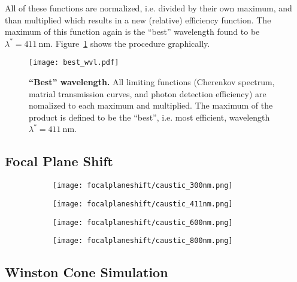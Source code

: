 All of these functions are normalized, i.e. divided by their own maximum, and than multiplied which results in a new (relative) efficiency function. The maximum of this function again is the \enquote{best} wavelength found to be $\lambda^\ast = \SI{411}{\nano\meter}$. Figure~\ref{best_wvl} shows the procedure graphically. 

\begin{figure}[H]
	\centering
	\texttt{[image: best\_wvl.pdf]}
	\caption[\enquote{Best} wavelength]{\textbf{\enquote{Best} wavelength.} All limiting functions (Cherenkov spectrum, matrial transmission curves, and photon detection efficiency) are nomalized to each maximum and multiplied. The maximum of the product is defined to be the \enquote{best}, i.e. most efficient, wavelength $\lambda^\ast=\SI{411}{\nano\meter}$.}
	\label{best_wvl}
\end{figure}

\subsection{Focal Plane Shift}

\begin{figure}[H]
	\centering
	\begin{subfigure}[t]{0.49\textwidth}
		\centering
		\texttt{[image: focalplaneshift/caustic\_300nm.png]}
		\subcaption{}
	\end{subfigure}
	\hfill
	\begin{subfigure}[t]{0.49\textwidth}
		\centering
		\texttt{[image: focalplaneshift/caustic\_411nm.png]}
		\subcaption{}
		\label{focalplaneshift_bestwvl}
	\end{subfigure}
	\hfill
	\begin{subfigure}[t]{0.49\textwidth}
		\centering
		\texttt{[image: focalplaneshift/caustic\_600nm.png]}
		\subcaption{}
	\end{subfigure}
	\hfill
	\begin{subfigure}[t]{0.49\textwidth}
		\centering
		\texttt{[image: focalplaneshift/caustic\_800nm.png]}
		\subcaption{}
	\end{subfigure}
	\caption[]{}
	\label{focalplaneshift}
\end{figure}

\subsection{Winston Cone Simulation}

